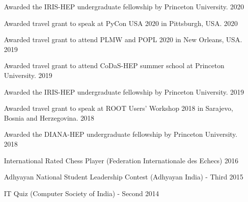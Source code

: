 \documentclass[10pt, letterpaper]{fulldeps}
\begin{document}
%
%

%
%
\begin{tightitemize}
    \item Awarded the IRIS-HEP undergraduate fellowship by Princeton University. \hfill{2020}
    \item Awarded travel grant to speak at PyCon USA 2020 in Pittsburgh, USA. \hfill{2020}
    \item Awarded travel grant to attend PLMW and POPL 2020 in New Orleans, USA. \hfill{2019}
    \item Awarded travel grant to attend CoDaS-HEP summer school at Princeton University. \hfill{2019}
    \item Awarded the IRIS-HEP undergraduate fellowship by Princeton University. \hfill{2019}
    \item Awarded travel grant to speak at ROOT Users' Workshop 2018 in Sarajevo, Bosnia and Herzegovina. \hfill{2018}
	\item Awarded the DIANA-HEP undergraduate fellowship by Princeton University. \hfill{2018}
\end{tightitemize}

\begin{tightitemize}
    \item International Rated Chess Player (Federation Internationale des Echecs) \hfill{2016}
    \item Adhyayan National Student Leadership Contest (Adhyayan India) - Third \hfill{2015}
    \item IT Quiz (Computer Society of India) - Second \hfill{2014}
\end{tightitemize}
\end{document}
